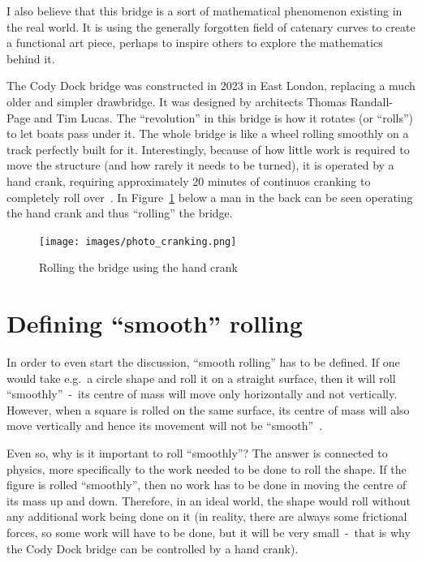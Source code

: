 \documentclass[12pt]{article}
\begin{document}
        I also believe that this bridge is a sort of mathematical phenomenon existing in the real world. It is using the generally forgotten field of catenary curves to create a functional art piece, perhaps to inspire others to explore the mathematics behind it.

        The Cody Dock bridge was constructed in 2023 in East London, replacing a much older and simpler drawbridge. It was designed by architects Thomas Randall-Page and Tim Lucas. The ``revolution'' in this bridge is how it rotates (or ``rolls'') to let boats pass under it. The whole bridge is like a wheel rolling smoothly on a track perfectly built for it. Interestingly, because of how little work is required to move the structure (and how rarely it needs to be turned), it is operated by a hand crank, requiring approximately 20 minutes of continuos cranking to completely roll over~\cite{bridge_newatlas,parker.2023}. In Figure~\ref{fig:photo_cranking} below a man in the back can be seen operating the hand crank and thus ``rolling'' the bridge.

        \begin{figure}[H]
            \centering
            \texttt{[image: images/photo\_cranking.png]}
            \caption[Rolling the bridge using the hand crank]{Rolling the bridge using the hand crank~\cite{bridge_photos}}\label{fig:photo_cranking}
        \end{figure}

    \section{Defining ``smooth'' rolling}

        In order to even start the discussion, ``smooth rolling'' has to be defined. If one would take e.g.\ a circle shape and roll it on a straight surface, then it will roll ``smoothly''~-~its centre of mass will move only horizontally and not vertically. However, when a square is rolled on the same surface, its centre of mass will also move vertically and hence its movement will not be ``smooth''~\cite{morphocular.2022,Hall_Wagon_1992}.

        Even so, why is it important to roll ``smoothly''? The answer is connected to physics, more specifically to the work needed to be done to roll the shape. If the figure is rolled ``smoothly'', then no work has to be done in moving the centre of its mass up and down. Therefore, in an ideal world, the shape would roll without any additional work being done on it (in reality, there are always some frictional forces, so some work will have to be done, but it will be very small~-~that is why the Cody Dock bridge can be controlled by a hand crank).
\end{document}
